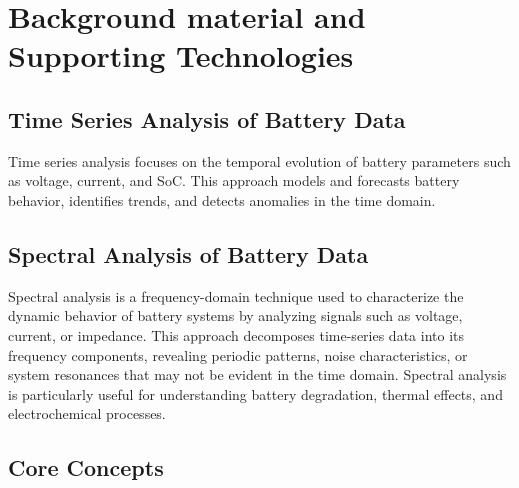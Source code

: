 


\chapter{Background material and Supporting Technologies}
\label{ch:background}
\lipsum[1]

\section{Time Series Analysis of Battery Data}
Time series analysis focuses on the temporal evolution of battery parameters such as voltage, current, and SoC. This approach models and forecasts battery behavior, identifies trends, and detects anomalies in the time domain.

\section{Spectral Analysis of Battery Data}
Spectral analysis is a frequency-domain technique used to characterize the dynamic behavior of battery systems by analyzing signals such as voltage, current, or impedance. This approach decomposes time-series data into its frequency components, revealing periodic patterns, noise characteristics, or system resonances that may not be evident in the time domain. Spectral analysis is particularly useful for understanding battery degradation, thermal effects, and electrochemical processes.

\section{Core Concepts}

